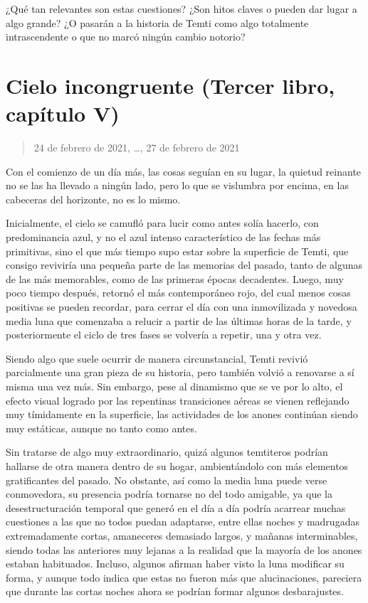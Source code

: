 \documentclass[
  spanish,
]{book}
\begin{document}
¿Qué tan relevantes son estas cuestiones? ¿Son hitos claves o pueden dar lugar a algo grande? ¿O pasarán a la historia de Temti como algo totalmente intrascendente o que no marcó ningún cambio notorio?

\hypertarget{cielo-incongruente-tercer-libro-capuxedtulo-v}{%
\section{Cielo incongruente (Tercer libro, capítulo V)}\label{cielo-incongruente-tercer-libro-capuxedtulo-v}}

\begin{quote}
24 de febrero de 2021, \ldots, 27 de febrero de 2021
\end{quote}

Con el comienzo de un día más, las cosas seguían en su lugar, la quietud reinante no se las ha llevado a ningún lado, pero lo que se vislumbra por encima, en las cabeceras del horizonte, no es lo mismo.

Inicialmente, el cielo se camufló para lucir como antes solía hacerlo, con predominancia azul, y no el azul intenso característico de las fechas más primitivas, sino el que más tiempo supo estar sobre la superficie de Temti, que consigo reviviría una pequeña parte de las memorias del pasado, tanto de algunas de las más memorables, como de las primeras épocas decadentes. Luego, muy poco tiempo después, retornó el más contemporáneo rojo, del cual menos cosas positivas se pueden recordar, para cerrar el día con una inmovilizada y novedosa media luna que comenzaba a relucir a partir de las últimas horas de la tarde, y posteriormente el ciclo de tres fases se volvería a repetir, una y otra vez.

Siendo algo que suele ocurrir de manera circunstancial, Temti revivió parcialmente una gran pieza de su historia, pero también volvió a renovarse a sí misma una vez más. Sin embargo, pese al dinamismo que se ve por lo alto, el efecto visual logrado por las repentinas transiciones aéreas se vienen reflejando muy tímidamente en la superficie, las actividades de los anones continúan siendo muy estáticas, aunque no tanto como antes.

Sin tratarse de algo muy extraordinario, quizá algunos temtiteros podrían hallarse de otra manera dentro de su hogar, ambientándolo con más elementos gratificantes del pasado. No obstante, así como la media luna puede verse conmovedora, su presencia podría tornarse no del todo amigable, ya que la desestructuración temporal que generó en el día a día podría acarrear muchas cuestiones a las que no todos puedan adaptarse, entre ellas noches y madrugadas extremadamente cortas, amaneceres demasiado largos, y mañanas interminables, siendo todas las anteriores muy lejanas a la realidad que la mayoría de los anones estaban habituados. Incluso, algunos afirman haber visto la luna modificar su forma, y aunque todo indica que estas no fueron más que alucinaciones, pareciera que durante las cortas noches ahora se podrían formar algunos desbarajustes.
\end{document}
